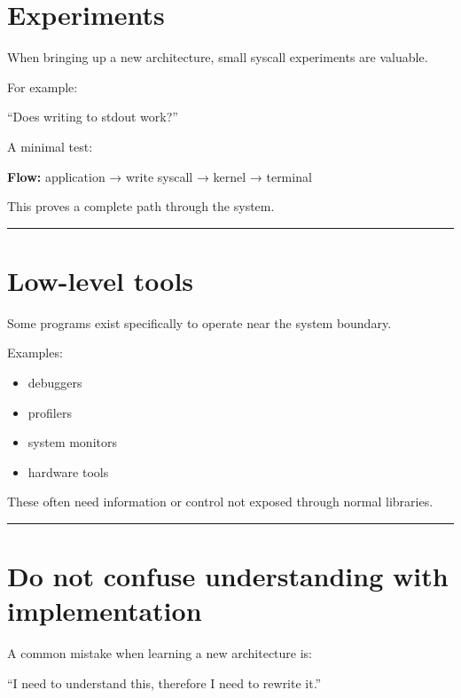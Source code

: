 \documentclass[
  oneside,
  openany]{book}
\providecommand{\tightlist}{%
  \setlength{\itemsep}{0pt}\setlength{\parskip}{0pt}}
\begin{document}
\hypertarget{experiments}{%
\section{Experiments}\label{experiments}}

When bringing up a new architecture, small syscall experiments are
valuable.

For example:

``Does writing to stdout work?''

A minimal test:

\textbf{Flow:} application → write syscall → kernel → terminal

This proves a complete path through the system.

\begin{center}\rule{0.5\linewidth}{0.5pt}\end{center}

\hypertarget{low-level-tools}{%
\section{Low-level tools}\label{low-level-tools}}

Some programs exist specifically to operate near the system boundary.

Examples:

\begin{itemize}
\tightlist
\item
  debuggers
\item
  profilers
\item
  system monitors
\item
  hardware tools
\end{itemize}

These often need information or control not exposed through normal
libraries.

\begin{center}\rule{0.5\linewidth}{0.5pt}\end{center}

\hypertarget{do-not-confuse-understanding-with-implementation}{%
\section{Do not confuse understanding with
implementation}\label{do-not-confuse-understanding-with-implementation}}

A common mistake when learning a new architecture is:

``I need to understand this, therefore I need to rewrite it.''
\end{document}
